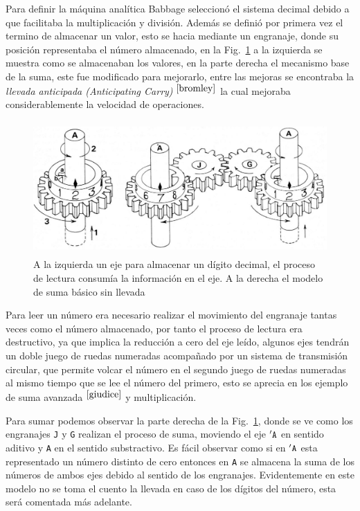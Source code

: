 \documentclass[runningheads,a4paper]{llncs}
\begin{document}
Para definir la máquina analítica Babbage seleccionó el sistema decimal debido a que facilitaba la 
multiplicación y división. Además se definió por primera vez el termino de almacenar un valor, esto 
se hacia mediante un engranaje, donde su posición representaba el número almacenado, en la 
Fig.~\ref{fig:SaA} a la izquierda se muestra como se almacenaban los valores, en la parte derecha el 
mecanismo base de la suma, este fue modificado para mejorarlo, entre las mejoras se encontraba la 
\emph{llevada anticipada (Anticipating Carry)} $^{\cite{bromley}}$ la cual mejoraba considerablemente la velocidad
de operaciones.

\begin{figure}
	\centering
	\includegraphics[height=5.1cm]{imgs/SaA}
	\caption{A la izquierda un eje para almacenar un dígito decimal, el proceso de lectura consumía 
	la información en el eje. A la derecha el modelo de suma básico sin llevada}
	\label{fig:SaA}
\end{figure}

Para leer un número era necesario realizar el movimiento del engranaje tantas veces como el número 
almacenado, por tanto el proceso de lectura era destructivo, ya que implica la reducción a cero del eje 
leído, algunos ejes tendrán un doble juego de ruedas numeradas acompañado por un sistema de transmisión 
circular, que permite volcar el número en el segundo juego de ruedas numeradas al mismo tiempo que se lee 
el número del primero, esto se aprecia en los ejemplo de suma avanzada $^{\cite{giudice}}$ y multiplicación.

Para sumar podemos observar la parte derecha de la Fig.~\ref{fig:SaA}, donde se ve como los engranajes 
\verb*|J| y \verb*|G| realizan el proceso de suma, moviendo el eje $'\verb*|A|$ en sentido aditivo y \verb*|A| 
en el sentido substractivo. Es fácil observar como si en $'\verb*|A|$ esta representado un número distinto de 
cero entonces en \verb*|A| se almacena la suma de los números de ambos ejes debido al sentido de los 
engranajes. Evidentemente en este modelo no se toma el cuento la llevada en caso de los dígitos del número, 
esta será comentada más adelante.
\end{document}
